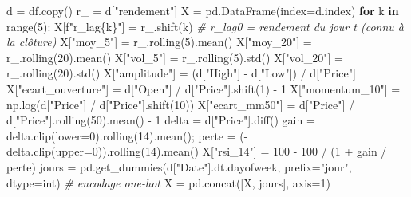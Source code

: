 \documentclass[
  10pt,
]{article}
\newenvironment{Shaded}{}{}
\newcommand{\BuiltInTok}[1]{\textcolor[rgb]{0.00,0.50,0.00}{#1}}
\newcommand{\CommentTok}[1]{\textcolor[rgb]{0.38,0.63,0.69}{\textit{#1}}}
\newcommand{\ControlFlowTok}[1]{\textcolor[rgb]{0.00,0.44,0.13}{\textbf{#1}}}
\newcommand{\DecValTok}[1]{\textcolor[rgb]{0.25,0.63,0.44}{#1}}
\newcommand{\KeywordTok}[1]{\textcolor[rgb]{0.00,0.44,0.13}{\textbf{#1}}}
\newcommand{\NormalTok}[1]{#1}
\newcommand{\OperatorTok}[1]{\textcolor[rgb]{0.40,0.40,0.40}{#1}}
\newcommand{\SpecialCharTok}[1]{\textcolor[rgb]{0.25,0.44,0.63}{#1}}
\newcommand{\SpecialStringTok}[1]{\textcolor[rgb]{0.73,0.40,0.53}{#1}}
\newcommand{\StringTok}[1]{\textcolor[rgb]{0.25,0.44,0.63}{#1}}
\begin{document}
\begin{Shaded}
\begin{Highlighting}[]
\NormalTok{d }\OperatorTok{=}\NormalTok{ df.copy()}
\NormalTok{r\_ }\OperatorTok{=}\NormalTok{ d[}\StringTok{"rendement"}\NormalTok{]}
\NormalTok{X }\OperatorTok{=}\NormalTok{ pd.DataFrame(index}\OperatorTok{=}\NormalTok{d.index)}
\ControlFlowTok{for}\NormalTok{ k }\KeywordTok{in} \BuiltInTok{range}\NormalTok{(}\DecValTok{5}\NormalTok{):}
\NormalTok{    X[}\SpecialStringTok{f"r\_lag}\SpecialCharTok{\{}\NormalTok{k}\SpecialCharTok{\}}\SpecialStringTok{"}\NormalTok{] }\OperatorTok{=}\NormalTok{ r\_.shift(k)                     }\CommentTok{\# r\_lag0 = rendement du jour t (connu à la clôture)}
\NormalTok{X[}\StringTok{"moy\_5"}\NormalTok{] }\OperatorTok{=}\NormalTok{ r\_.rolling(}\DecValTok{5}\NormalTok{).mean()}
\NormalTok{X[}\StringTok{"moy\_20"}\NormalTok{] }\OperatorTok{=}\NormalTok{ r\_.rolling(}\DecValTok{20}\NormalTok{).mean()}
\NormalTok{X[}\StringTok{"vol\_5"}\NormalTok{] }\OperatorTok{=}\NormalTok{ r\_.rolling(}\DecValTok{5}\NormalTok{).std()}
\NormalTok{X[}\StringTok{"vol\_20"}\NormalTok{] }\OperatorTok{=}\NormalTok{ r\_.rolling(}\DecValTok{20}\NormalTok{).std()}
\NormalTok{X[}\StringTok{"amplitude"}\NormalTok{] }\OperatorTok{=}\NormalTok{ (d[}\StringTok{"High"}\NormalTok{] }\OperatorTok{{-}}\NormalTok{ d[}\StringTok{"Low"}\NormalTok{]) }\OperatorTok{/}\NormalTok{ d[}\StringTok{"Price"}\NormalTok{]}
\NormalTok{X[}\StringTok{"ecart\_ouverture"}\NormalTok{] }\OperatorTok{=}\NormalTok{ d[}\StringTok{"Open"}\NormalTok{] }\OperatorTok{/}\NormalTok{ d[}\StringTok{"Price"}\NormalTok{].shift(}\DecValTok{1}\NormalTok{) }\OperatorTok{{-}} \DecValTok{1}
\NormalTok{X[}\StringTok{"momentum\_10"}\NormalTok{] }\OperatorTok{=}\NormalTok{ np.log(d[}\StringTok{"Price"}\NormalTok{] }\OperatorTok{/}\NormalTok{ d[}\StringTok{"Price"}\NormalTok{].shift(}\DecValTok{10}\NormalTok{))}
\NormalTok{X[}\StringTok{"ecart\_mm50"}\NormalTok{] }\OperatorTok{=}\NormalTok{ d[}\StringTok{"Price"}\NormalTok{] }\OperatorTok{/}\NormalTok{ d[}\StringTok{"Price"}\NormalTok{].rolling(}\DecValTok{50}\NormalTok{).mean() }\OperatorTok{{-}} \DecValTok{1}
\NormalTok{delta }\OperatorTok{=}\NormalTok{ d[}\StringTok{"Price"}\NormalTok{].diff()}
\NormalTok{gain }\OperatorTok{=}\NormalTok{ delta.clip(lower}\OperatorTok{=}\DecValTok{0}\NormalTok{).rolling(}\DecValTok{14}\NormalTok{).mean()}\OperatorTok{;}\NormalTok{ perte }\OperatorTok{=}\NormalTok{ (}\OperatorTok{{-}}\NormalTok{delta.clip(upper}\OperatorTok{=}\DecValTok{0}\NormalTok{)).rolling(}\DecValTok{14}\NormalTok{).mean()}
\NormalTok{X[}\StringTok{"rsi\_14"}\NormalTok{] }\OperatorTok{=} \DecValTok{100} \OperatorTok{{-}} \DecValTok{100} \OperatorTok{/}\NormalTok{ (}\DecValTok{1} \OperatorTok{+}\NormalTok{ gain }\OperatorTok{/}\NormalTok{ perte)}
\NormalTok{jours }\OperatorTok{=}\NormalTok{ pd.get\_dummies(d[}\StringTok{"Date"}\NormalTok{].dt.dayofweek, prefix}\OperatorTok{=}\StringTok{"jour"}\NormalTok{, dtype}\OperatorTok{=}\BuiltInTok{int}\NormalTok{)   }\CommentTok{\# encodage one{-}hot}
\NormalTok{X }\OperatorTok{=}\NormalTok{ pd.concat([X, jours], axis}\OperatorTok{=}\DecValTok{1}\NormalTok{)}


\end{Highlighting}
\end{Shaded}
\end{document}
